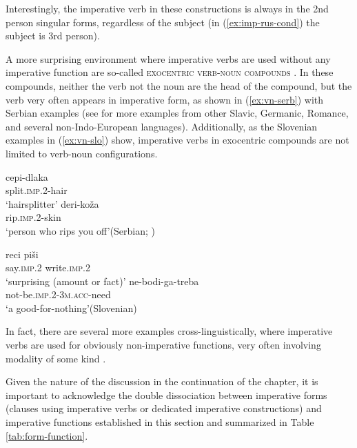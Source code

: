 \documentclass[output=paper,colorlinks,citecolor=brown]{langscibook}
\begin{document}
\noindent Interestingly, the imperative verb in these constructions is always in the 2nd person singular forms, regardless of the subject (in (\ref{ex:imp-rus-cond}) the subject is 3rd person).

A more surprising environment where imperative verbs are used without any imperative function are so-called \textsc{exocentric verb-noun compounds} \citep{progovac12}. In these compounds, neither the verb not the noun are the head of the compound, but the verb very often appears in imperative form, as shown in (\ref{ex:vn-serb}) with Serbian examples (see \citealt{progovac12} for more examples from other Slavic, Germanic, Romance, and several non-Indo-European languages). Additionally, as the Slovenian examples in (\ref{ex:vn-slo}) show, imperative verbs in exocentric compounds are not limited to verb-noun configurations.

\begin{exe}
\ex \label{ex:vn-serb}
\begin{xlist}
\ex 
\gll cepi-dlaka\\
     split.\textsc{imp.2}-hair\\
\glt `hairsplitter'    
\ex
\gll deri-ko\v{z}a\\
     rip.\textsc{imp.2}-skin\\
\glt `person who rips you off'\hfill (Serbian; \citealt[51]{progovac12})

\end{xlist}
\ex \label{ex:vn-slo}
\begin{xlist}
\ex
\gll reci pi\v{s}i\\
     say.\textsc{imp.2} write.\textsc{imp.2}\\
\glt `surprising (amount or fact)'      
\ex
\gll ne-bodi-ga-treba\\
     not-be.\textsc{imp.2}-\textsc{3m.acc}-need\\
\glt `a good-for-nothing'\hfill (Slovenian)
\end{xlist}
\end{exe}

\noindent In fact, there are several more examples cross-linguistically, where imperative verbs are used for obviously non-imperative functions, very often involving modality of some kind \citep[see][Ch.~7]{aikhenvald10}.

Given the nature of the discussion in the continuation of the chapter, it is important to acknowledge the double dissociation between imperative forms (clauses using imperative verbs or dedicated imperative constructions) and imperative functions established in this section and summarized in Table \ref{tab:form-function}. %
\end{document}
